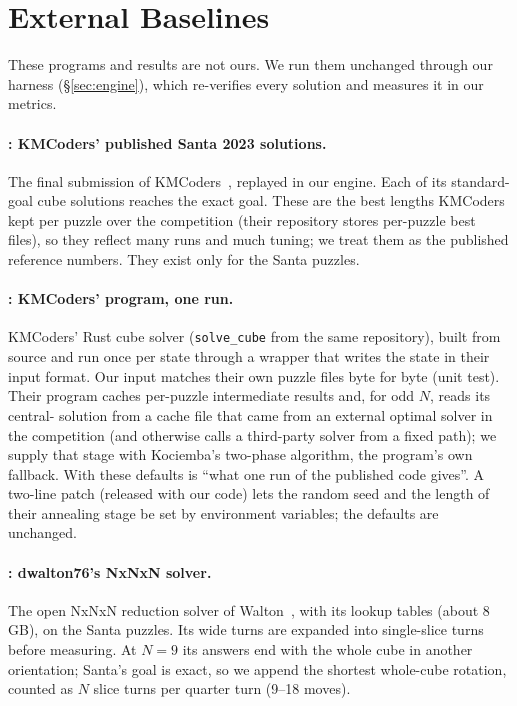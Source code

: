 \section{External Baselines}
\label{sec:baselines}

These programs and results are not ours. We run them unchanged through our harness (\S\ref{sec:engine}), which
re-verifies every solution and measures it in our metrics.

\paragraph{\Bone: KMCoders' published Santa 2023 solutions.}
The final submission of KMCoders~\cite{kmcoders2024santa}, replayed in our engine. Each of its \SantaTotal{}
standard-goal cube solutions reaches the exact goal. These are the best lengths KMCoders kept per puzzle over the
competition (their repository stores per-puzzle best files), so they reflect many runs and much tuning; we treat
them as the published reference numbers. They exist only for the Santa puzzles.

\paragraph{\Btwo: KMCoders' program, one run.}
KMCoders' Rust cube solver (\texttt{solve\_cube} from the same repository), built from source and run once per state
through a wrapper that writes the state in their input format. Our input matches their own puzzle files byte for byte
(unit test). Their program caches per-puzzle intermediate results and, for odd $N$, reads its central- solution
from a cache file that came from an external optimal solver in the competition (and otherwise calls a third-party
solver from a fixed path); we supply that stage with Kociemba's two-phase algorithm, the program's own fallback. With
these defaults \Btwo is ``what one run of the published code gives''. A two-line patch (released with our code) lets the
random seed and the length of their annealing stage be set by environment variables; the defaults are unchanged.

\paragraph{\Bthree: dwalton76's NxNxN solver.}
The open NxNxN reduction solver of Walton~\cite{walton2017nxnxn}, with its lookup tables (about 8\,GB), on the Santa puzzles. Its wide turns are expanded into single-slice turns before measuring. At $N=9$ its answers end with the whole cube in another orientation; Santa's
goal is exact, so we append the shortest whole-cube rotation, counted as $N$ slice turns per quarter turn (9--18 moves).

